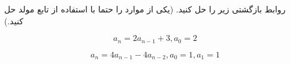 \EXERCISE
روابط بازگشتی زیر را حل کنید. (یکی از موارد را حتما با استفاده از تابع مولد حل کنید.)

$$a_n = 2a_{n-1} + 3, a_0 = 2$$

$$a_n = 4a_{n-1} - 4a_{n-2}, a_0 = 1, a_1 = 1$$